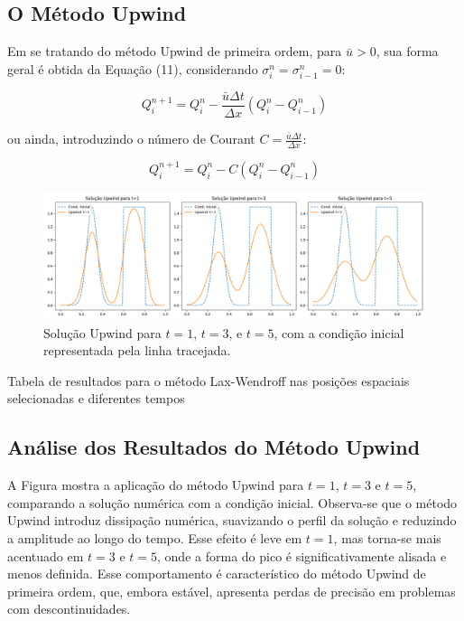 \subsection{O Método Upwind}

Em se tratando do método Upwind de primeira ordem, para $\bar{u} > 0$, sua forma geral é obtida da Equação (11), considerando $\sigma_i^n = \sigma_{i-1}^n = 0$:

\begin{equation}
Q_i^{n+1} = Q_i^n - \frac{\bar{u} \Delta t}{\Delta x} (Q_i^n - Q_{i-1}^n)
\end{equation}

ou ainda, introduzindo o número de Courant $C = \frac{\bar{u} \Delta t}{\Delta x}$:

\begin{equation}
Q_i^{n+1} = Q_i^n - C (Q_i^n - Q_{i-1}^n)
\end{equation}



\begin{figure}[H]
    \centering
    \includegraphics[width=\textwidth]{code/images/Upwind.png}
    \caption{Solução Upwind para $t=1$, $t=3$, e $t=5$, com a condição inicial representada pela linha tracejada.}
\end{figure}


\begin{table}[H]
    \centering
    
    \caption{Tabela de resultados para o método Lax-Wendroff nas posições espaciais selecionadas e diferentes tempos}
    \label{tab:upwind}
\end{table}

\subsection{Análise dos Resultados do Método Upwind}

A Figura mostra a aplicação do método Upwind para \( t = 1 \), \( t = 3 \) e \( t = 5 \), comparando a solução numérica com a condição inicial. Observa-se que o método Upwind introduz dissipação numérica, suavizando o perfil da solução e reduzindo a amplitude ao longo do tempo. Esse efeito é leve em \( t=1 \), mas torna-se mais acentuado em \( t=3 \) e \( t=5 \), onde a forma do pico é significativamente alisada e menos definida. Esse comportamento é característico do método Upwind de primeira ordem, que, embora estável, apresenta perdas de precisão em problemas com descontinuidades.

